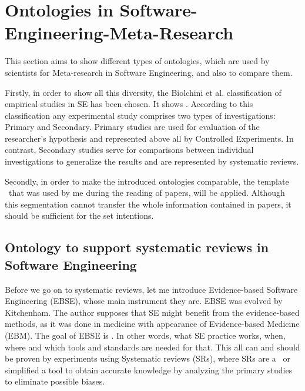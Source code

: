 		

\section{Ontologies in Software-Engineering-Meta-Research}
\label{sec:OntinSEMR:start}  
This section aims to show different types of ontologies, which are used by scientists for Meta-research in Software Engineering, and also to compare them.

Firstly, in order to show all this diversity, the Biolchini et al. \cite{Bio07} classification of empirical studies in SE has been chosen. It shows \frqq\cite[p. 1]{Gar08}. According to this classification any experimental study comprises two types of investigations: Primary and Secondary\cite[p. 134]{Bio07}. Primary studies are used for evaluation of the researcher's hypothesis and represented above all by Controlled Experiments. In contrast, Secondary studies serve for comparisons between individual investigations to generalize the results and are represented by systematic reviews.

Secondly, in order to make the introduced ontologies comparable, the template  \frqq \ that was used by me during the reading of papers, will be applied. Although this segmentation cannot transfer the whole information contained in papers, it should be sufficient for the set intentions.
    
 
	\subsection{Ontology to support systematic reviews in Software Engineering}  
	Before we go on to systematic reviews, let me introduce Evidence-based Software Engineering (EBSE), whose main instrument they are. EBSE was evolved by Kitchenham\cite{Kit04}. The author supposes that SE might benefit from the evidence-based methods, as it was done in medicine with appearance of Evidence-based Medicine (EBM). The goal of EBSE is \frqq \cite[p. 2]{Kit04}. In other words, what SE practice works,  when, where and which tools and standards are needed for that. This all can and should be proven by experiments using Systematic reviews (SRs), where SRs are a \frqq \cite{Kit07} \ or simplified a tool to obtain accurate knowledge by analyzing the primary studies to eliminate possible biases.
	
